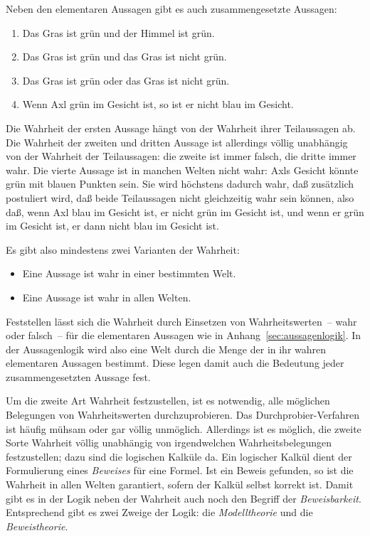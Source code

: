 Neben den elementaren
Aussagen
gibt es auch zusammengesetzte Aussagen:
%
\begin{enumerate}
\item Das Gras ist grün und der Himmel ist grün.
\item Das Gras ist grün und das Gras ist nicht grün.
\item Das Gras ist grün oder das Gras ist nicht grün.
\item Wenn Axl grün im Gesicht ist, so ist er nicht blau im Gesicht.
\end{enumerate}
%
Die Wahrheit der ersten Aussage hängt von der Wahrheit ihrer
Teilaussagen ab.  Die Wahrheit der zweiten und dritten Aussage ist
allerdings völlig unabhängig von der Wahrheit der Teilaussagen: die
zweite ist immer falsch, die dritte immer wahr.  Die vierte Aussage
ist in manchen Welten nicht wahr: Axls Gesicht könnte grün mit
blauen Punkten sein.  Sie wird höchstens dadurch wahr, daß zusätzlich postuliert
wird, daß beide Teilaussagen nicht gleichzeitig wahr sein können,
also daß, wenn Axl blau im Gesicht ist, er nicht grün im Gesicht ist,
und wenn er grün im Gesicht ist, er dann nicht blau im Gesicht ist.

Es gibt also mindestens zwei Varianten der Wahrheit:
%
\begin{itemize}
\item Eine Aussage ist wahr in einer bestimmten Welt.
\item Eine Aussage ist wahr in allen Welten.
\end{itemize}
%
Feststellen lässt sich die Wahrheit durch Einsetzen von
Wahrheitswerten~-- wahr oder falsch~--
für die elementaren Aussagen wie in
Anhang~\ref{sec:aussagenlogik}.  In der
Aussagenlogik wird also eine Welt durch die Menge der in ihr wahren
elementaren Aussagen bestimmt.  Diese legen damit auch die Bedeutung jeder
zusammengesetzten Aussage fest.

Um die
zweite Art Wahrheit festzustellen, ist es notwendig, alle möglichen
Belegungen von Wahrheitswerten durchzuprobieren.  
Das Durchprobier-Verfahren ist häufig mühsam oder gar völlig unmöglich.  
Allerdings ist es möglich, die zweite Sorte Wahrheit völlig
unabhängig von irgendwelchen Wahrheitsbelegungen festzustellen; dazu
sind die logischen Kalküle da.  Ein logischer Kalkül dient der
Formulierung eines \textit{Beweises} für eine Formel.  Ist ein Beweis
gefunden, so ist die Wahrheit in allen Welten garantiert, sofern der Kalkül
selbst korrekt ist.  Damit gibt
es in der Logik neben der Wahrheit auch noch den Begriff der
\textit{Beweisbarkeit}.  Entsprechend gibt es zwei Zweige der Logik:
die \textit{Modelltheorie} und die \textit{Beweistheorie}.

